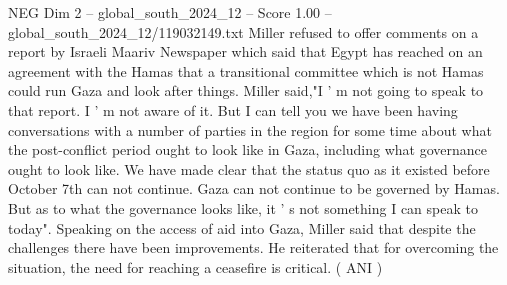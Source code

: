 \begin{textsample}{NEG Dim 2 – global\_south\_2024\_12 – Score 1.00 – global\_south\_2024\_12/119032149.txt}
Miller refused to offer comments on a report by Israeli Maariv Newspaper which said that Egypt has reached on an agreement with the Hamas that a transitional committee which is not Hamas could run Gaza and look after things.
Miller said,"I ' m not going to speak to that report.
I ' m not aware of it.
But I can tell you we have been having conversations with a number of parties in the region for some time about what the post-conflict period ought to look like in Gaza, including what governance ought to look like.
We have made clear that the status quo as it existed before October 7th can not continue.
Gaza can not continue to be governed by Hamas.
But as to what the governance looks like, it ' s not something I can speak to today".
Speaking on the access of aid into Gaza, Miller said that despite the challenges there have been improvements.
He reiterated that for overcoming the situation, the need for reaching a ceasefire is critical. ( ANI )

\end{textsample}
